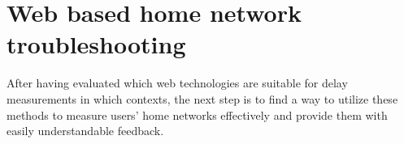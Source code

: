 \documentclass{sig-alternate-10pt}
\begin{document}

\section{Web based home network troubleshooting}

\label{sec:troubleshooting}


After having evaluated which web technologies are suitable for delay measurements in which contexts, the next step is to find a way to utilize these methods to measure users' home networks effectively and provide them with easily understandable feedback. 
\end{document}
